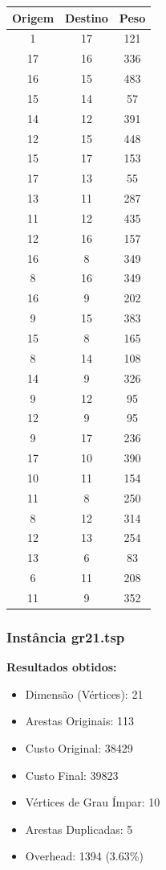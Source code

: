 \documentclass[12pt]{article}
\begin{document}
\begin{longtable}{|c|c|c|}
\hline Origem & Destino & Peso \\
\hline 1 & 17 & 121 \\
\hline 17 & 16 & 336 \\
\hline 16 & 15 & 483 \\
\hline 15 & 14 & 57 \\
\hline 14 & 12 & 391 \\
\hline 12 & 15 & 448 \\
\hline 15 & 17 & 153 \\
\hline 17 & 13 & 55 \\
\hline 13 & 11 & 287 \\
\hline 11 & 12 & 435 \\
\hline 12 & 16 & 157 \\
\hline 16 & 8 & 349 \\
\hline 8 & 16 & 349 \\
\hline 16 & 9 & 202 \\
\hline 9 & 15 & 383 \\
\hline 15 & 8 & 165 \\
\hline 8 & 14 & 108 \\
\hline 14 & 9 & 326 \\
\hline 9 & 12 & 95 \\
\hline 12 & 9 & 95 \\
\hline 9 & 17 & 236 \\
\hline 17 & 10 & 390 \\
\hline 10 & 11 & 154 \\
\hline 11 & 8 & 250 \\
\hline 8 & 12 & 314 \\
\hline 12 & 13 & 254 \\
\hline 13 & 6 & 83 \\
\hline 6 & 11 & 208 \\
\hline 11 & 9 & 352 \\
\hline\end{longtable}

\subsubsection{Instância gr21.tsp}

\textbf{Resultados obtidos:}
\begin{itemize}
    \item Dimensão (Vértices): 21
    \item Arestas Originais: 113
    \item Custo Original: 38429
    \item Custo Final: 39823
    \item Vértices de Grau Ímpar: 10
    \item Arestas Duplicadas: 5
    \item Overhead: 1394 (3.63\%)
\end{itemize}
\end{document}
